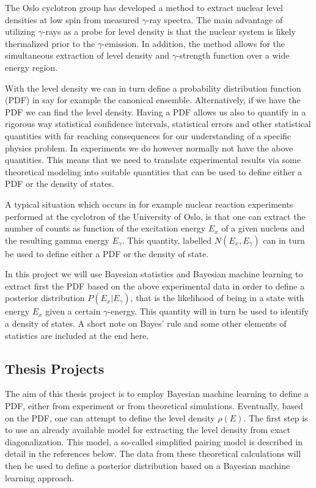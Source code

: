 \documentclass[%
oneside,                 %
final,                   %
10pt]{article}
\begin{document}
The Oslo cyclotron group has developed a method to extract nuclear
level densities at low spin from measured $\gamma$-ray spectra.  The
main advantage of utilizing $\gamma$-rays as a probe for level density
is that the nuclear system is likely thermalized prior to the
$\gamma$-emission. In addition, the method allows for the simultaneous
extraction of level density and $\gamma$-strength function over a wide
energy region.


With the level density we can in turn define a probability
distribution function (PDF) in say for example the canonical
ensemble. Alternatively, if we have the PDF we can find the level
density.  Having a PDF allows us also to quantify in a rigorous way
statistical confidence intervals, statistical errors and other
statistical quantities with far reaching consequences for our
understanding of a specific physics problem.  In experiments we do
however normally not have the above quantities. This means that we
need to translate experimental results via some theoretical modeling
into suitable quantities that can be used to define either a PDF or
the density of states.

A typical situation which occurs in for example nuclear reaction
experiments performed at the cyclotron of the University of Oslo, is
that one can extract the number of counts as function of the
excitation energy $E_x$ of a given nucleus and the resulting gamma
energy $E_{\gamma}$. This quantity, labelled
$N(E_x,E_{\gamma})$ can in turn be used to define either a PDF or the
density of state.


In this project we will use Bayesian statistics and Bayesian machine
learning to extract first the PDF based on the above experimental data
in order to define a posterior distribution $P(E_x\vert E_{\gamma})$,
that is the likelihood of being in a state with energy $E_x$ given a
certain $\gamma$-energy.  This quantity will in turn be used to
identify a density of states. A short note on Bayes' rule and some
other elements of statistics are included at the end here.


\subsection{Thesis Projects}

The aim of this thesis project is to employ Bayesian machine learning to
define a PDF, either from experiment or from theoretical simulations.
Eventually, based on the PDF, one can attempt to define the level density
$\rho(E)$. The first step is to use an
already available model for extracting the level density from exact
diagonalization. This model, a so-called simplified pairing model is
described in detail in the references below.
The 
data from these theoretical calculations
will then be used to define a posterior distribution based on a
Bayesian machine learning approach.
\end{document}

